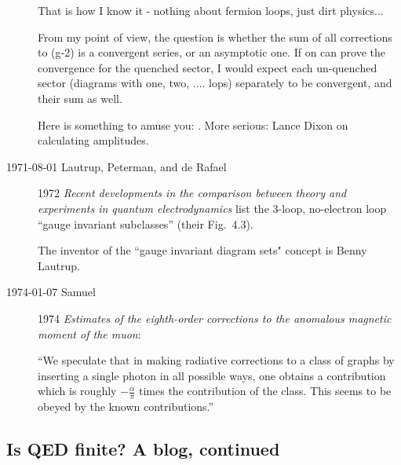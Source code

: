 \begin{description}
That is how I know it - nothing about fermion loops, just dirt physics...

From my point of view, the question is whether the sum of all
corrections to (g-2) is a convergent series, or an asymptotic one.
If on can prove the convergence for the quenched sector, I would
expect each un-quenched sector (diagrams with one, two, .... lops)
separately to be convergent, and their sum as well.

Here is something to amuse you:
.
More serious: Lance Dixon
{on calculating amplitudes}.

\item[1971-08-01 Lautrup, Peterman, and de Rafael]
 1972 {\em Recent
developments in the comparison between theory and experiments in quantum
electrodynamics} list the 3-loop, no-electron loop ``gauge invariant
subclasses'' (their Fig.~4.3).

The inventor of the ``gauge invariant diagram sets" concept is Benny
Lautrup.

\item[1974-01-07 Samuel]
1974 {\em Estimates of the eighth-order corrections
to the anomalous magnetic moment of the muon}:

``We speculate that in making radiative corrections to a class of graphs
by inserting a single photon in all possible ways, one obtains a
contribution which is roughly $-\frac{\alpha}{\pi}$ times the
contribution of the class. This seems to be obeyed by the known
contributions.''

\end{description}

\subsection{Is QED finite? A blog, continued}
\label{sect:finiteBlog}


